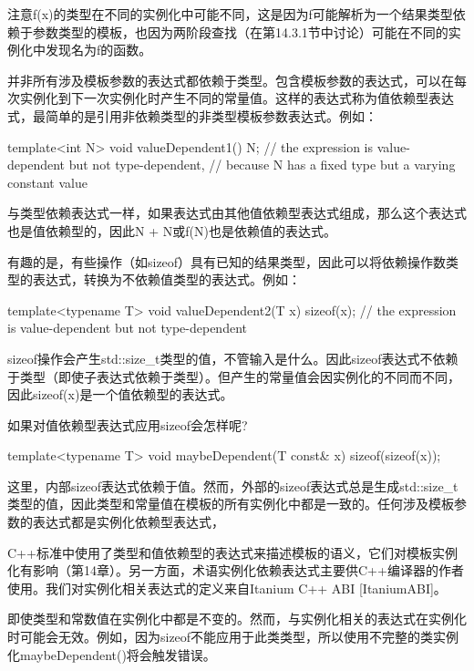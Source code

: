 注意f(x)的类型在不同的实例化中可能不同，这是因为f可能解析为一个结果类型依赖于参数类型的模板，也因为两阶段查找（在第14.3.1节中讨论）可能在不同的实例化中发现名为f的函数。

并非所有涉及模板参数的表达式都依赖于类型。包含模板参数的表达式，可以在每次实例化到下一次实例化时产生不同的常量值。这样的表达式称为值依赖型表达式，最简单的是引用非依赖类型的非类型模板参数表达式。例如：

\begin{cpp}
template<int N> void valueDependent1() {
	N; // the expression is value-dependent but not type-dependent,
	// because N has a fixed type but a varying constant value
}
\end{cpp}

与类型依赖表达式一样，如果表达式由其他值依赖型表达式组成，那么这个表达式也是值依赖型的，因此N + N或f(N)也是依赖值的表达式。

有趣的是，有些操作（如sizeof）具有已知的结果类型，因此可以将依赖操作数类型的表达式，转换为不依赖值类型的表达式。例如：

\begin{cpp}
template<typename T> void valueDependent2(T x) {
	sizeof(x); // the expression is value-dependent but not type-dependent
}
\end{cpp}

sizeof操作会产生std::size\_t类型的值，不管输入是什么。因此sizeof表达式不依赖于类型（即使子表达式依赖于类型）。但产生的常量值会因实例化的不同而不同，因此sizeof(x)是一个值依赖型的表达式。

如果对值依赖型表达式应用sizeof会怎样呢?

\begin{cpp}
template<typename T> void maybeDependent(T const& x) {
	sizeof(sizeof(x));
}
\end{cpp}

这里，内部sizeof表达式依赖于值。然而，外部的sizeof表达式总是生成std::size\_t类型的值，因此类型和常量值在模板的所有实例化中都是一致的。任何涉及模板参数的表达式都是实例化依赖型表达式，

\begin{notice}
C++标准中使用了类型和值依赖型的表达式来描述模板的语义，它们对模板实例化有影响（第14章）。另一方面，术语实例化依赖表达式主要供C++编译器的作者使用。我们对实例化相关表达式的定义来自Itanium C++ ABI [ItaniumABI]。
\end{notice}

即使类型和常数值在实例化中都是不变的。然而，与实例化相关的表达式在实例化时可能会无效。例如，因为sizeof不能应用于此类类型，所以使用不完整的类实例化maybeDependent()将会触发错误。

